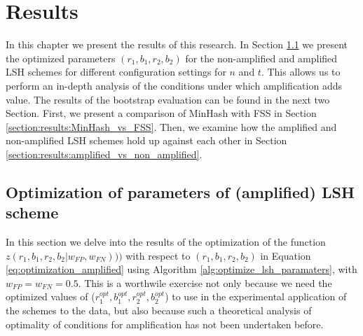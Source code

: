 \chapter{Results}
\label{chap:results}
In this chapter we present the results of this research. In Section \ref{section:results:results_optimization} we present the optimized parameters $(r_1,b_1,r_2,b_2)$ for the non-amplified and amplified LSH schemes for different configuration settings for $n$ and $t$. This allows us to perform an in-depth analysis of the conditions under which amplification adds value. The results of the bootstrap evaluation can be found in the next two Section. First, we present a comparison of MinHash with FSS in Section \ref{section:results:MinHash_vs_FSS}. Then, we examine how the amplified and non-amplified LSH schemes hold up against each other in Section \ref{section:results:amplified_vs_non_amplified}.

\section{Optimization of parameters of (amplified) LSH scheme}
\label{section:results:results_optimization}
In this section we delve into the results of the optimization of the function $z(r_1,b_1,r_2,b_2| w_{FP}, w_{FN})))$ with respect to $(r_1,b_1,r_2,b_2)$ in Equation \ref{eq:optimization_amplified} using Algorithm \ref{alg:optimize_lsh_paramaters}, with $w_{FP} = w_{FN} = 0.5$. This is a worthwile exercise not only because we need the optimized values of ($r_1^{opt},b_1^{opt},r_2^{opt},b_2^{opt}$) to use in the experimental application of the schemes to the data, but also because such a theoretical analysis of optimality of conditions for amplification has not been undertaken before. 


